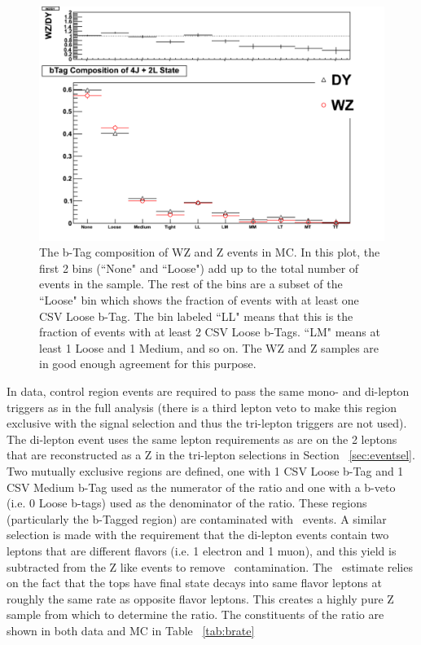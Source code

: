 \begin{figure}[h]
\begin{center}
\includegraphics[width=0.48\linewidth]{Figs/WZ_Vs_DY_bComposition.pdf}
\caption{\label{fig:wz_v_dy_btags}
The b-Tag composition of WZ and Z events in MC. In this plot, the first 2 bins (``None" and ``Loose") add up to the total number of events in the sample. The rest of the bins are a subset of the ``Loose" bin which shows the fraction of events with at least one CSV Loose b-Tag. The bin labeled ``LL" means that this is the fraction of events with at least 2 CSV Loose b-Tags. ``LM" means at least 1 Loose and 1 Medium, and so on. The WZ and Z samples are in good enough agreement for this purpose.
}
\end{center}
\end{figure}

In data, control region events are required to pass the same mono- and di-lepton triggers as in the full analysis (there is a third lepton veto to make this region exclusive with the signal selection and thus the tri-lepton triggers are not used). The di-lepton event uses the same lepton requirements as are on the 2 leptons that are reconstructed as a Z in the tri-lepton selections in Section ~\ref{sec:eventsel}. Two mutually exclusive regions are defined, one with 1 CSV Loose b-Tag and 1 CSV Medium b-Tag used as the numerator of the ratio and one with a b-veto (i.e. 0 Loose b-tags) used as the denominator of the ratio. These regions (particularly the b-Tagged region) are contaminated with \ttbar \ events. A similar selection is made with the requirement that the di-lepton events contain two leptons that are different flavors (i.e. 1 electron and 1 muon), and this yield is subtracted from the Z like events to remove \ttbar \ contamination. The \ttbar \ estimate relies on the fact that the tops have final state decays into same flavor leptons at roughly the same rate as opposite flavor leptons. This creates a highly pure Z sample from which to determine the ratio. The constituents of the ratio are shown in both data and MC in Table ~\ref{tab:brate}

